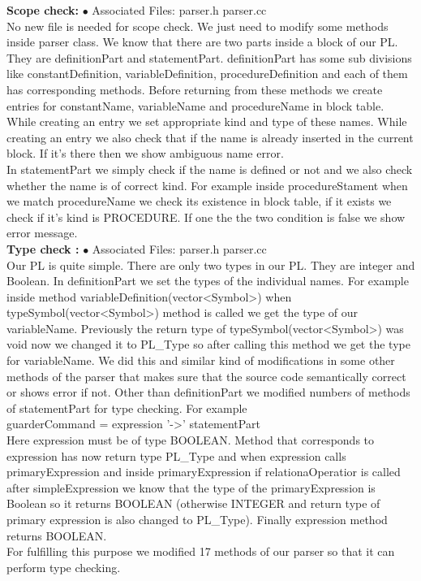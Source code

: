 \documentclass[paper=letter, fontsize=12pt]{scrartcl} %
\begin{document}
{\bf Scope check:}
$\bullet$ Associated Files: parser.h parser.cc\\
No new file is needed for scope check. We just need to modify some methods inside parser class. We know that there are two parts inside a block of our PL. They are definitionPart and statementPart. definitionPart has some sub divisions like constantDefinition, variableDefinition, procedureDefinition and each of them has corresponding methods. Before returning from these methods we create entries for constantName, variableName and procedureName in  block table. While creating an entry we set appropriate kind and type of these names. While creating an entry we also check that if the name is already inserted in the current block. If it's there then we show ambiguous name error.\\
In statementPart we simply check if the name is defined or not and we also check whether the name is of correct kind. For example inside procedureStament when we match procedureName we check its existence in block table, if it exists we check if it's kind is PROCEDURE. If one the the two condition is false we show error message. \\

{\bf Type check :}      
$\bullet$ Associated Files: parser.h parser.cc\\
Our PL is quite simple. There are only two types in our PL. They are integer and Boolean. In definitionPart we set the types of the individual names. For example inside method variableDefinition(vector<Symbol>) when typeSymbol(vector<Symbol>) method is  called we get the type of our variableName. Previously the return type of typeSymbol(vector<Symbol>) was void now we changed it to PL\_Type so after calling this method we get the type for variableName. We did this and similar kind of modifications in some other methods of the parser that makes sure that the source code semantically correct or shows error if not. Other than definitionPart we modified numbers of methods of statementPart for type checking. For example\\

guarderCommand = expression '->' statementPart\\

Here expression must be of type BOOLEAN. Method that corresponds to expression has now return type PL\_Type and when expression calls primaryExpression and inside primaryExpression if relationaOperatior is called after simpleExpression we know that the type of the primaryExpression is Boolean so it returns BOOLEAN (otherwise INTEGER and return type of primary expression is also changed to PL\_Type). Finally expression method returns BOOLEAN. \\
For fulfilling this purpose we modified 17 methods of our parser so that it can perform type checking.\\
\end{document}
